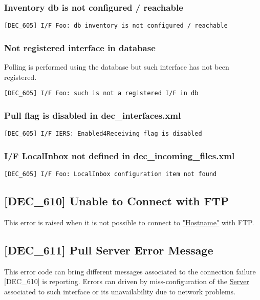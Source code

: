 \documentclass[dec_sum_main.tex]{subfiles}
\begin{document}
\subsubsection{Inventory db is not configured / reachable }
\begin{verbatim}
[DEC_605] I/F Foo: db inventory is not configured / reachable
\end{verbatim}

\subsubsection{Not registered interface in database }
Polling is performed using the database but such interface has not been registered.
\begin{verbatim}
[DEC_605] I/F Foo: such is not a registered I/F in db
\end{verbatim}

\subsubsection{Pull flag is disabled in  dec\_interfaces.xml }
\begin{verbatim}
[DEC_605] I/F IERS: Enabled4Receiving flag is disabled
\end{verbatim}

\subsubsection{I/F LocalInbox not defined in  dec\_incoming\_files.xml }
\begin{verbatim}
[DEC_605] I/F Foo: LocalInbox configuration item not found
\end{verbatim}

\label{DEC610}
\subsection{[DEC\_610] Unable to Connect with FTP}
This error is raised when it is not possible to connect to \hyperref[Config_Server]{"Hostname"} with FTP.

\subsection{[DEC\_611] Pull Server Error Message}
\label{DEC611}
This error code can bring different messages associated to the connection failure [DEC\_610] is reporting. Errors can driven by miss-configuration of the \hyperref[Config_Server]{Server} associated to such interface or its unavailability due to network problems.
\end{document}
